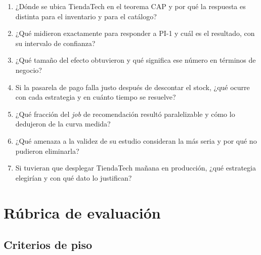 \documentclass[11pt,a4paper]{article}
\begin{document}
\begin{enumerate}[leftmargin=*,itemsep=4pt]
	\item ¿Dónde se ubica TiendaTech en el teorema CAP y por qué la respuesta es distinta para el inventario y para el catálogo?
	\item ¿Qué midieron exactamente para responder a PI-1 y cuál es el resultado, con su intervalo de confianza?
	\item ¿Qué tamaño del efecto obtuvieron y qué significa ese número en términos de negocio?
	\item Si la pasarela de pago falla justo después de descontar el stock, ¿qué ocurre con cada estrategia y en cuánto tiempo se resuelve?
	\item ¿Qué fracción del \emph{job} de recomendación resultó paralelizable y cómo lo dedujeron de la curva medida?
	\item ¿Qué amenaza a la validez de su estudio consideran la más seria y por qué no pudieron eliminarla?
	\item Si tuvieran que desplegar TiendaTech mañana en producción, ¿qué estrategia elegirían y con qué dato lo justifican?
\end{enumerate}

\section{Rúbrica de evaluación}

\subsection{Criterios de piso}
\end{document}
